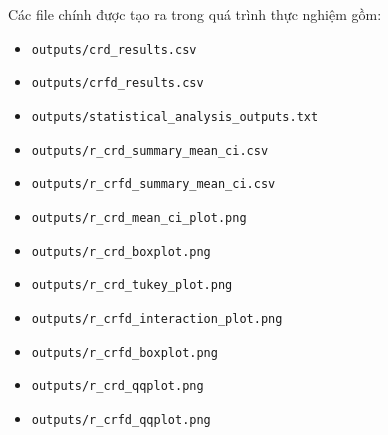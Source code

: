 \documentclass[12pt,a4paper]{article}
\begin{document}
Các file chính được tạo ra trong quá trình thực nghiệm gồm:
\begin{itemize}
    \item \texttt{outputs/crd\_results.csv}
    \item \texttt{outputs/crfd\_results.csv}
    \item \texttt{outputs/statistical\_analysis\_outputs.txt}
    \item \texttt{outputs/r\_crd\_summary\_mean\_ci.csv}
    \item \texttt{outputs/r\_crfd\_summary\_mean\_ci.csv}
    \item \texttt{outputs/r\_crd\_mean\_ci\_plot.png}
    \item \texttt{outputs/r\_crd\_boxplot.png}
    \item \texttt{outputs/r\_crd\_tukey\_plot.png}
    \item \texttt{outputs/r\_crfd\_interaction\_plot.png}
    \item \texttt{outputs/r\_crfd\_boxplot.png}
    \item \texttt{outputs/r\_crd\_qqplot.png}
    \item \texttt{outputs/r\_crfd\_qqplot.png}
\end{itemize}
\end{document}
